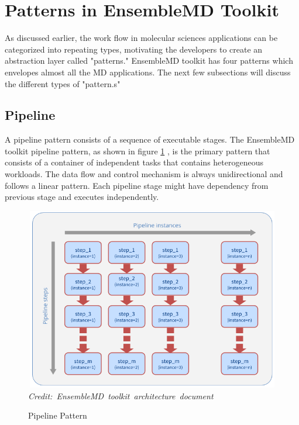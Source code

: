 \documentclass[10pt]{ruthesis}
\begin{document}

\section{Patterns in EnsembleMD Toolkit}
As discussed earlier, the work flow in molecular sciences applications can be categorized into repeating types, motivating the developers to create an abstraction layer called "patterns." EnsembleMD toolkit has four patterns which envelopes almost all the MD applications. The next few subsections will discuss the different types of "pattern.s"

\subsection{Pipeline}
A pipeline pattern consists of a sequence of executable stages. The EnsembleMD toolkit pipeline pattern, as shown in figure \ref{fig:pipeline} \cite{site1}, is the primary pattern that consists of a container of independent tasks that contains heterogeneous workloads. The data flow and control mechanism is always unidirectional and follows a linear pattern. Each pipeline stage might have dependency from previous stage and executes independently. 
\begin{figure}
  \centering
  \includegraphics[width=12cm,height=8cm]{pipeline_pattern.png}
  \hbox{\small\itshape Credit: EnsembleMD toolkit architecture document \cite{site1}}
  \caption{Pipeline Pattern}
  \label{fig:pipeline}
\end{figure}
\end{document}
